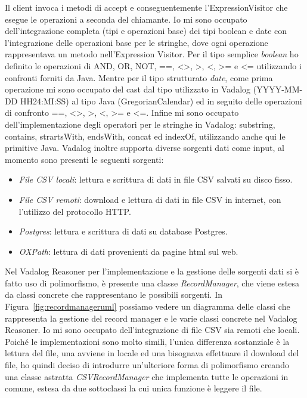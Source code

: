 Il client invoca i metodi di accept e conseguentemente l'ExpressionVisitor che esegue le operazioni a seconda del chiamante. \newline
Io mi sono occupato dell'integrazione completa (tipi e operazioni base) dei tipi boolean e date con l'integrazione delle operazioni base per le stringhe, dove ogni operazione rappresentava un metodo nell'Expression Visitor. \newline
Per il tipo semplice \emph{boolean} ho definito le operazioni di AND, OR, NOT, ==, <>, >, <, >= e <= utilizzando i confronti forniti da Java. Mentre per il tipo strutturato \emph{date}, come prima operazione mi sono occupato del cast dal tipo utilizzato in Vadalog (YYYY-MM-DD HH24:MI:SS) al tipo Java (GregorianCalendar) ed in seguito delle operazioni di confronto ==, <>, >, <, >= e <=. Infine mi sono occupato dell'implementazione degli operatori per le stringhe in Vadalog: substring, contains, strartsWith, endsWith, concat ed indexOf, utilizzando anche qui le primitive Java.  \newline \newline
Vadalog inoltre supporta diverse sorgenti dati come input, al momento sono presenti le seguenti sorgenti:
\begin{itemize}
	\item \emph{File CSV locali}: lettura e scrittura di dati in file CSV salvati su disco fisso.
	\item \emph{File CSV remoti}: download e lettura di dati in file CSV in internet, con l'utilizzo del protocollo HTTP.
	\item \emph{Postgres}: lettura e scrittura di dati su database Postgres.
	\item \emph{OXPath}: lettura di dati provenienti da pagine html sul web.
\end{itemize}
Nel Vadalog Reasoner per l'implementazione e la gestione delle sorgenti dati si è fatto uso di polimorfismo, è presente una classe \emph{RecordManager}, che viene estesa da classi concrete che rappresentano le possibili sorgenti. \newline
In Figura~\ref{fig:recordmanageruml} possiamo vedere un diagramma delle classi che rappresenta la gestione del record manager e le varie classi concrete nel Vadalog Reasoner. \newline
Io mi sono occupato dell'integrazione di file CSV sia remoti che locali. Poiché le implementazioni sono molto simili, l'unica differenza sostanziale è la lettura del file, una avviene in locale ed una bisognava effettuare il download del file, ho quindi deciso di introdurre un'ulteriore forma di polimorfismo creando una classe astratta \emph{CSVRecordManager} che implementa tutte le operazioni in comune, estesa da due sottoclassi la cui unica funzione è leggere il file. \newline
